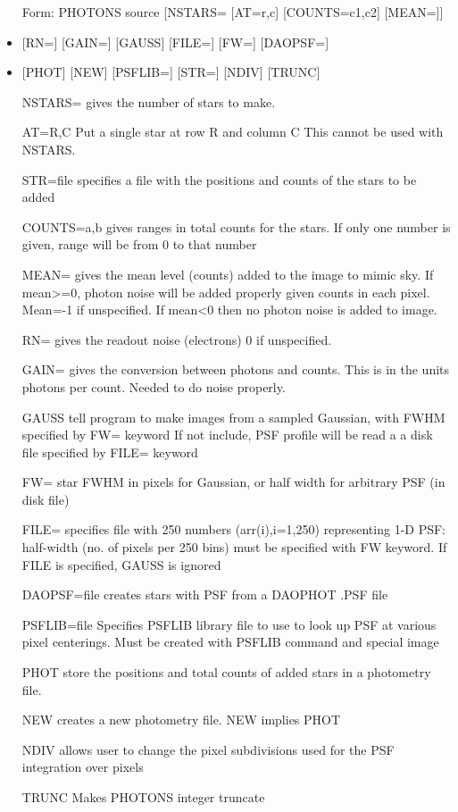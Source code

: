 \begin{itemize}
  \item[Form: PHOTONS source [NSTARS=] [AT=r,c] [COUNTS=c1,c2] [MEAN=]\hfill]{}
  \item{[RN=] [GAIN=] [GAUSS] [FILE=] [FW=] [DAOPSF=]}
  \item{[PHOT] [NEW] [PSFLIB=] [STR=] [NDIV] [TRUNC]}
  \item[NSTARS=]{gives the number of stars to make.}
  \item[AT=R,C]{Put a single star at row R and column C
       This cannot be used with NSTARS.}
  \item[STR=file]{specifies a file with the positions and
       counts of the stars to be added}
  \item[COUNTS=a,b]{gives ranges in total counts for the
       stars. If only one number is given, range will be from 0 to that number}
  \item[MEAN=]{gives the mean level (counts) added to the image to mimic
       sky. If mean>=0, photon noise will be added properly given counts in
       each pixel.  Mean=-1 if unspecified. If mean<0 then no photon noise
       is added to image. }
  \item[RN=]{ gives the readout noise (electrons) 0 if unspecified. }
  \item[GAIN=]{gives the conversion between photons and counts.  This is in
       the units photons per count. Needed to do noise properly.}
  \item[GAUSS ]{tell program to make images from a sampled Gaussian, with
       FWHM specified by FW= keyword If not include, PSF profile will be
       read a a disk file specified by FILE= keyword}
  \item[FW=]{star FWHM in pixels for Gaussian, or half width for arbitrary
       PSF (in disk file)}
  \item[FILE=]{ specifies file with 250 numbers (arr(i),i=1,250)
       representing 1-D PSF: half-width (no. of pixels per 250 bins) must
       be specified with FW keyword.  If FILE is specified, GAUSS is
       ignored}
  \item[DAOPSF=file]{creates stars with PSF from a DAOPHOT .PSF file}
  \item[PSFLIB=file]{Specifies PSFLIB library file to use to look up PSF at
       various pixel centerings. Must be created with PSFLIB command and
       special image}
  \item[PHOT]{store the positions and total counts of added
       stars in a photometry file. }
  \item[NEW]{creates a new photometry file.  NEW implies PHOT}
  \item[NDIV]{allows user to change the pixel subdivisions
       used for the PSF integration over pixels}
  \item[TRUNC]{Makes PHOTONS integer truncate}
\end{itemize}

